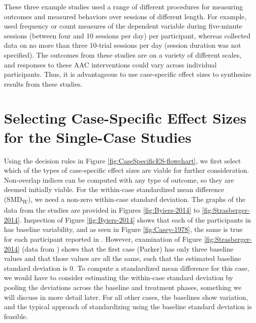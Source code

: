 \documentclass[
]{book}
\begin{document}
These three example studies used a range of different procedures for measuring outcomes and measured behaviors over sessions of different length. For example, \citet{Byiers2014} used frequency or count measures of the dependent variable during five-minute sessions (between four and 10 sessions per day) per participant, whereas \citet{StrasbergerFerreri2014} collected data on no more than three 10-trial sessions per day (session duration was not specified). The outcomes from these studies are on a variety of different scales, and responses to these AAC interventions could vary across individual participants. Thus, it is advantageous to use case-specific effect sizes to synthesize results from these studies.

\hypertarget{selecting-case-specific-effect-sizes-for-the-single-case-studies}{%
\section{Selecting Case-Specific Effect Sizes for the Single-Case Studies}\label{selecting-case-specific-effect-sizes-for-the-single-case-studies}}

Using the decision rules in Figure \ref{fig:CaseSpecificES-flowchart}, we first select which of the types of case-specific effect sizes are viable for further consideration. Non-overlap indices can be computed with any type of outcome, so they are deemed initially viable. For the within-case standardized mean difference (SMD\textsubscript{W}), we need a non-zero within-case standard deviation. The graphs of the data from the studies are provided in Figures \ref{fig:Byiers-2014} to \ref{fig:Strasberger-2014}. Inspection of Figure \ref{fig:Byiers-2014} shows that each of the participants in \citet{Byiers2014} has baseline variability, and as seen in Figure \ref{fig:Casey-1978}, the same is true for each participant reported in \citet{Casey1978}. However, examination of Figure \ref{fig:Strasberger-2014} (data from \citet{StrasbergerFerreri2014}) shows that the first case (Parker) has only three baseline values and that those values are all the same, such that the estimated baseline standard deviation is 0. To compute a standardized mean difference for this case, we would have to consider estimating the within-case standard deviation by pooling the deviations across the baseline and treatment phases, something we will discuss in more detail later. For all other cases, the baselines show variation, and the typical approach of standardizing using the baseline standard deviation is feasible.
\end{document}
